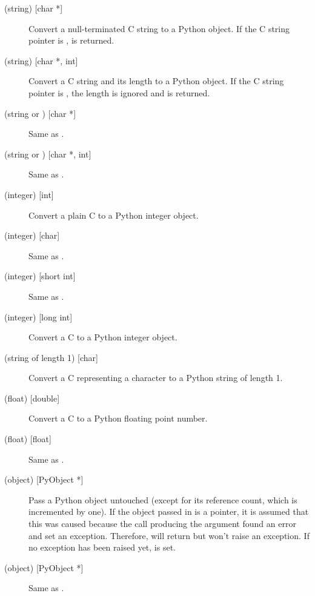 \begin{description}

\item[ (string) {[char *]}]
Convert a null-terminated C string to a Python object.  If the C
string pointer is ,  is returned.

\item[ (string) {[char *, int]}]
Convert a C string and its length to a Python object.  If the C string
pointer is , the length is ignored and  is
returned.

\item[ (string or ) {[char *]}]
Same as .

\item[ (string or ) {[char *, int]}]
Same as .

\item[ (integer) {[int]}]
Convert a plain C  to a Python integer object.

\item[ (integer) {[char]}]
Same as .

\item[ (integer) {[short int]}]
Same as .

\item[ (integer) {[long int]}]
Convert a C  to a Python integer object.

\item[ (string of length 1) {[char]}]
Convert a C  representing a character to a Python string of
length 1.

\item[ (float) {[double]}]
Convert a C  to a Python floating point number.

\item[ (float) {[float]}]
Same as .

\item[ (object) {[PyObject *]}]
Pass a Python object untouched (except for its reference count, which
is incremented by one).  If the object passed in is a 
pointer, it is assumed that this was caused because the call producing
the argument found an error and set an exception.  Therefore,
 will return  but won't raise an
exception.  If no exception has been raised yet,
 is set.

\item[ (object) {[PyObject *]}]
Same as .


\end{description}
